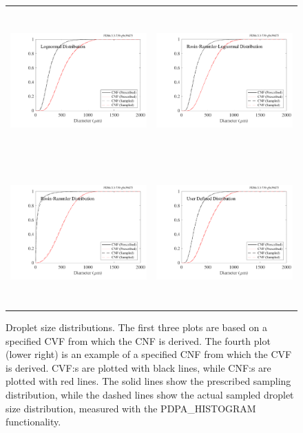 \documentclass[11pt]{book}
\begin{document}
\begin{figure}[ht]
\begin{tabular}{ll}
\includegraphics[height=2.2in]{SCRIPT_FIGURES/droplet_distributions_1} &
\includegraphics[height=2.2in]{SCRIPT_FIGURES/droplet_distributions_2} \\
\includegraphics[height=2.2in]{SCRIPT_FIGURES/droplet_distributions_3} &
\includegraphics[height=2.2in]{SCRIPT_FIGURES/droplet_distributions_4}
\end{tabular}
\caption[Droplet size distributions]{Droplet size distributions. The first three plots are based on a specified CVF from which the CNF is derived. The fourth plot (lower right) is an example of a specified CNF from which the CVF is derived. CVF:s are plotted with black lines, while CNF:s are plotted with red lines. The solid lines show the prescribed sampling distribution, while the dashed lines show the actual sampled droplet size distribution, measured with the {\ct PDPA\_HISTOGRAM} functionality.}
\label{droplet_distributions}
\end{figure}
\end{document}
